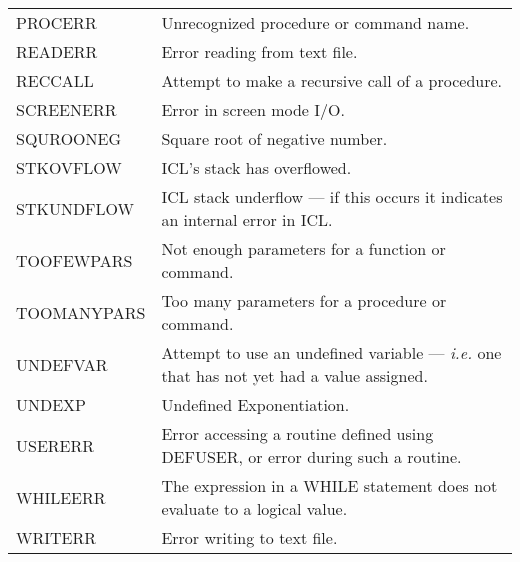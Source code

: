 \begin{center}
\begin{tabular}{ll}
PROCERR  &  Unrecognized procedure or command name.  \\
READERR &  Error reading from text file. \\
RECCALL  &  Attempt to make a recursive call of a procedure. \\
SCREENERR  &  Error in screen mode I/O. \\
SQUROONEG  &  Square root of negative number. \\
STKOVFLOW  &  ICL's stack has overflowed. \\
STKUNDFLOW  &  ICL stack underflow --- if this occurs it indicates an internal
   error in ICL. \\
TOOFEWPARS  &  Not enough parameters for a function or command. \\
TOOMANYPARS  &  Too many parameters for a procedure or command. \\
UNDEFVAR  &  Attempt to use an undefined variable --- {\em i.e.} one that has
   not yet had a value assigned.  \\
UNDEXP  &  Undefined Exponentiation.  \\
USERERR  &  Error accessing a routine defined using DEFUSER, or error during
   such a routine. \\
WHILEERR & The expression in a WHILE statement does not evaluate to a logical
   value. \\                    
WRITERR  &  Error writing to text file.
\end{tabular}
\end{center}
